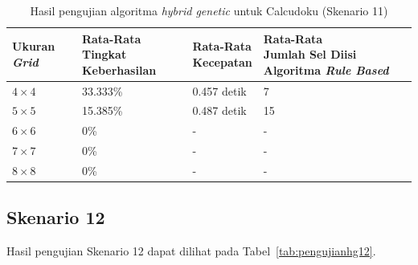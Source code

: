 \begin{table}
\centering
\captionsetup{justification=centering}
\caption[Hasil pengujian algoritma \textit{hybrid genetic} untuk Calcudoku (Skenario 11)]{Hasil pengujian algoritma \textit{hybrid genetic} untuk Calcudoku (Skenario 11)}
\begin{tabular}{| l | l | l | l |}
\hline
Ukuran \textit{Grid} & \makecell[c]{Rata-Rata \\ Tingkat Keberhasilan} & \makecell[c]{Rata-Rata \\ Kecepatan} & \makecell[c]{Rata-Rata \\ Jumlah Sel Diisi Algoritma \textit{Rule Based}} \\
\hline \hline
\begin{math}4 \times 4\end{math} & 33.333\% & 0.457 detik & 7 \\
\hline
\begin{math}5 \times 5\end{math} & 15.385\% & 0.487 detik & 15 \\
\hline
\begin{math}6 \times 6\end{math} & 0\% & - & - \\
\hline
\begin{math}7 \times 7\end{math} & 0\% & - & - \\
\hline
\begin{math}8 \times 8\end{math} & 0\% & - & - \\
\hline
\end{tabular}
\label{tab:pengujianhg11}
\end{table}

\subsection{Skenario 12}
\label{sec:skenario12}

Hasil pengujian Skenario 12 dapat dilihat pada Tabel~\ref{tab:pengujianhg12}.

